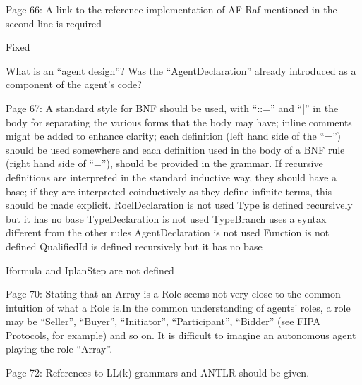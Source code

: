 \documentclass{article}
\newcommand{\todo}[1]{[\textcolor{red}{TODO}: #1]}
\newenvironment{them}{\noindent\begingroup\color{blue}}{\endgroup\par}
\begin{document}
\begin{them}

Page 66:
A link to the reference implementation of AF-Raf mentioned in the second line
is required

\end{them}
Fixed

\begin{them}

What is an “agent design”? Was the “AgentDeclaration” already introduced as a
component of the agent's code?

\end{them}
\todo{explain}

\begin{them}

Page 67:
A standard style for BNF should be used, with “::=” and “|” in the body for
separating the various forms that the body may have; inline comments might be
added to enhance clarity; each definition (left hand side of the “=”) should be
used somewhere and each definition used in the body of a BNF rule (right hand
side of “=”), should be provided in the grammar. If recursive definitions are
interpreted in the standard inductive way, they should have a base; if they are
interpreted coinductively as they define infinite terms, this should be made
explicit.  RoelDeclaration is not used Type is defined recursively but it has
no base TypeDeclaration is not used TypeBranch uses a syntax different from the
other rules AgentDeclaration is not used Function is not defined QualifiedId is
defined recursively but it has no base

\end{them}
\todo{}

\begin{them}

Iformula and IplanStep are not defined
\end{them}
\todo{}

\begin{them}

Page 70:
Stating that an Array is a Role seems not very close to the common intuition of
what a Role is.In the common understanding of agents' roles, a role may be
“Seller”, “Buyer”, “Initiator”, “Participant”, “Bidder” (see FIPA Protocols,
for example) and so on. It is difficult to imagine an autonomous agent playing
the role “Array”.

\end{them}
\todo{}

\begin{them}

Page 72:
References to LL(k) grammars and ANTLR should be given.
\end{them}
\todo{}
\end{document}
